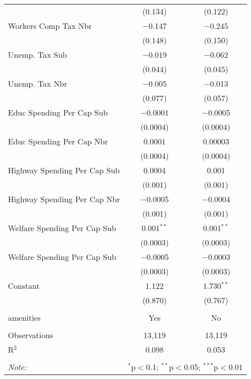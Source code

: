 \begin{table}[!htbp]
\begin{tabular}{@{\extracolsep{5pt}}lcc}
  & (0.134) & (0.122) \\ 
  Workers Comp Tax Nbr & $-$0.147 & $-$0.245 \\ 
  & (0.148) & (0.150) \\ 
  Unemp. Tax Sub & $-$0.019 & $-$0.062 \\ 
  & (0.044) & (0.045) \\ 
  Unemp. Tax Nbr & $-$0.005 & $-$0.013 \\ 
  & (0.077) & (0.057) \\ 
  Educ Spending Per Cap Sub & $-$0.0001 & $-$0.0005 \\ 
  & (0.0004) & (0.0004) \\ 
  Educ Spending Per Cap Nbr & 0.0001 & 0.00003 \\ 
  & (0.0004) & (0.0004) \\ 
  Highway Spending Per Cap Sub & 0.0004 & 0.001 \\ 
  & (0.001) & (0.001) \\ 
  Highway Spending Per Cap Nbr & $-$0.0005 & $-$0.0004 \\ 
  & (0.001) & (0.001) \\ 
  Welfare Spending Per Cap Sub & 0.001$^{**}$ & 0.001$^{**}$ \\ 
  & (0.0003) & (0.0003) \\ 
  Welfare Spending Per Cap Sub & $-$0.0005 & $-$0.0003 \\ 
  & (0.0003) & (0.0003) \\ 
  Constant & 1.122 & 1.730$^{**}$ \\ 
  & (0.870) & (0.767) \\ 
 \hline \\[-1.8ex] 
amenities & Yes & No \\ 
\hline \\[-1.8ex] 
Observations & 13,119 & 13,119 \\ 
R$^{2}$ & 0.098 & 0.053 \\ 
\hline 
\hline \\[-1.8ex] 
\textit{Note:}  & \multicolumn{2}{r}{$^{*}$p$<$0.1; $^{**}$p$<$0.05; $^{***}$p$<$0.01} \\ 
\end{tabular} 
\end{table} 
